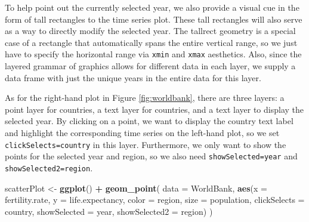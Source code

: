 \documentclass[12pt,]{article}
\newenvironment{Shaded}{\begin{snugshade}}{\end{snugshade}}
\newcommand{\DataTypeTok}[1]{\textcolor[rgb]{0.13,0.29,0.53}{#1}}
\newcommand{\FloatTok}[1]{\textcolor[rgb]{0.00,0.00,0.81}{#1}}
\newcommand{\KeywordTok}[1]{\textcolor[rgb]{0.13,0.29,0.53}{\textbf{#1}}}
\newcommand{\NormalTok}[1]{#1}
\newcommand{\OperatorTok}[1]{\textcolor[rgb]{0.81,0.36,0.00}{\textbf{#1}}}
\newcommand{\StringTok}[1]{\textcolor[rgb]{0.31,0.60,0.02}{#1}}
\theoremstyle{definition}
\theoremstyle{definition}
\theoremstyle{definition}
\theoremstyle{remark}
\begin{document}
To help point out the currently selected year, we also provide a visual
cue in the form of tall rectangles to the time series plot. These tall
rectangles will also serve as a way to directly modify the selected
year. The tallrect geometry is a special case of a rectangle that
automatically spans the entire vertical range, so we just have to
specify the horizontal range via \texttt{xmin} and \texttt{xmax}
aesthetics. Also, since the layered grammar of graphics allows for
different data in each layer, we supply a data frame with just the
unique years in the entire data for this layer.

\begin{Shaded}
\end{Shaded}

As for the right-hand plot in Figure \ref{fig:worldbank}, there are
three layers: a point layer for countries, a text layer for countries,
and a text layer to display the selected year. By clicking on a point,
we want to display the country text label and highlight the
corresponding time series on the left-hand plot, so we set
\texttt{clickSelects=country} in this layer. Furthermore, we only want
to show the points for the selected year and region, so we also need
\texttt{showSelected=year} and \texttt{showSelected2=region}.

\begin{Shaded}
\begin{Highlighting}[]
\NormalTok{scatterPlot <-}\StringTok{ }\KeywordTok{ggplot}\NormalTok{() }\OperatorTok{+}\StringTok{ }\KeywordTok{geom_point}\NormalTok{(}
  \DataTypeTok{data =}\NormalTok{ WorldBank,}
  \KeywordTok{aes}\NormalTok{(}\DataTypeTok{x =}\NormalTok{ fertility.rate, }\DataTypeTok{y =}\NormalTok{ life.expectancy,}
      \DataTypeTok{color =}\NormalTok{ region, }\DataTypeTok{size =}\NormalTok{ population,}
      \DataTypeTok{clickSelects =}\NormalTok{ country,}
      \DataTypeTok{showSelected =}\NormalTok{ year,}
      \DataTypeTok{showSelected2 =}\NormalTok{ region)}
\NormalTok{)}
\end{Highlighting}
\end{Shaded}
\end{document}
